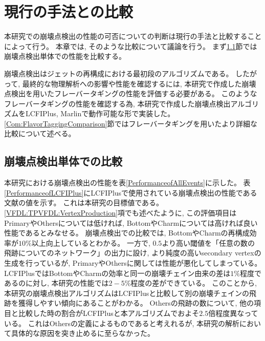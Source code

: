 
\chapter{現行の手法との比較} \label{chap:Comparison}

本研究での崩壊点検出の性能の可否についての判断は現行の手法と比較することによって行う。
本章では, そのような比較について議論を行う。
まず\ref{Com:ComparisonwithVF}節では崩壊点検出単体での性能を比較する。

崩壊点検出はジェットの再構成における最初段のアルゴリズムである。
したがって, 最終的な物理解析への影響や性能を確認するには, 本研究で作成した崩壊点検出を用いたフレーバータギングの性能を評価する必要がある。
このようなフレーバータギングの性能を確認する為, 本研究で作成した崩壊点検出アルゴリズムをLCFIPlus, Marlinで動作可能な形で実装した。
\ref{Com:FlavorTaggingComparison}節ではフレーバータギングを用いたより詳細な比較について述べる。


\section{崩壊点検出単体での比較} \label{Com:ComparisonwithVF}

本研究における崩壊点検出の性能を表\ref{PerformanceofAllEvents}に示した。
表\ref{PerformanceofLCFIPlus}にLCFIPlusで使用されている崩壊点検出の性能である文献\cite{LCFIPlusPaper}の値を示す。
これは本研究の目標値である。
\ref{VFDL:TPVFDL:VertexProduction}項でも述べたように, この評価項目はPrimaryやOthersについては低ければ, BottomやCharmについては高ければ良い性能であるとみなせる。
崩壊点検出での比較では, BottomやCharmの再構成効率が$10\%$以上向上しているとわかる。
一方で, $0.5$より高い閾値を「任意の数の飛跡についてのネットワーク」の出力に設け, より純度の高いsecondary vertexの生成を行っているが, PrimaryやOthersに関しては性能が悪化してしまっている。
LCFIPlusではBottomやCharmの効率と同一の崩壊チェイン由来の差は$1\%$程度であるのに対し, 本研究の性能では$2-5\%$程度の差ができている。
このことから, 本研究の崩壊点検出アルゴリズムはLCFIPlusと比較して別の崩壊チェインの飛跡を獲得しやすい傾向にあることがわかる。
Othersの飛跡の数について, 他の項目と比較した時の割合がLCFIPlusと本アルゴリズムでおよそ$2.5$倍程度異なっている。
これはOthersの定義によるものであると考えれるが, 本研究の解析において具体的な原因を突き止めるに至らなかった。

